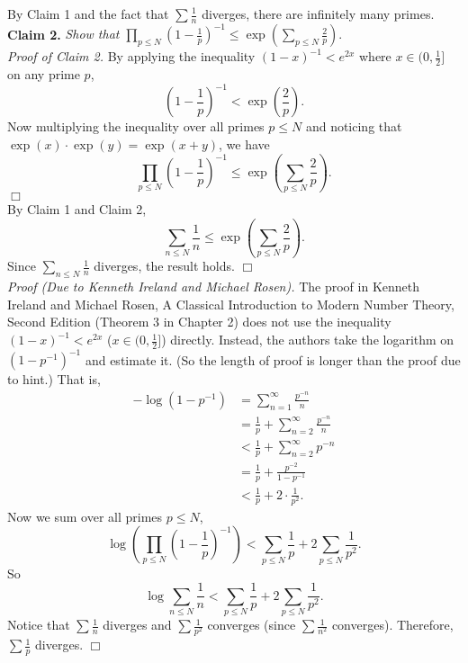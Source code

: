 \documentclass{article}
\begin{document}
By Claim 1 and the fact that $\sum \frac{1}{n}$ diverges,
there are infinitely many primes. \\

\textbf{Claim 2.}
\emph{Show that
$\prod_{p \leq N} \left( 1 - \frac{1}{p} \right)^{-1}
\leq \exp \left( \sum_{p \leq N} \frac{2}{p} \right).$} \\
\emph{Proof of Claim 2.}
By applying the inequality $(1 - x)^{-1} < e^{2x}$ where $x \in (0, \frac{1}{2}]$
on any prime $p$,
$$\left( 1 - \frac{1}{p} \right)^{-1} < \exp \left( \frac{2}{p} \right).$$
Now multiplying the inequality over all primes $p \leq N$ and noticing that
$\exp(x) \cdot \exp(y) = \exp(x + y)$, we have
$$\prod_{p \leq N} \left( 1 - \frac{1}{p} \right)^{-1}
\leq \exp \left( \sum_{p \leq N} \frac{2}{p} \right).$$
$\Box$ \\

By Claim 1 and Claim 2,
$$\sum_{n \leq N} \frac{1}{n}
\leq \exp \left( \sum_{p \leq N} \frac{2}{p} \right).$$
Since $\sum_{n \leq N} \frac{1}{n}$ diverges, the result holds.
$\Box$ \\



\emph{Proof (Due to Kenneth Ireland and Michael Rosen).}
The proof in Kenneth Ireland and Michael Rosen,
A Classical Introduction to Modern Number Theory, Second Edition (Theorem 3 in Chapter 2)
does not use the inequality $(1 - x)^{-1} < e^{2x}$ ($x \in (0, \frac{1}{2}]$) directly.
Instead, the authors take the logarithm on $(1 - p^{-1})^{-1}$ and estimate it.
(So the length of proof is longer than the proof due to hint.)
That is,
\begin{align*}
- \log(1 - p^{-1})
&= \sum_{n = 1}^{\infty} \frac{p^{-n}}{n} \\
&= \frac{1}{p} + \sum_{n = 2}^{\infty} \frac{p^{-n}}{n} \\
&< \frac{1}{p} + \sum_{n = 2}^{\infty} p^{-n} \\
&= \frac{1}{p} + \frac{p^{-2}}{1 - p^{-1}} \\
&< \frac{1}{p} + 2 \cdot \frac{1}{p^2}.
\end{align*}
Now we sum over all primes $p \leq N$,
$$\log \left( \prod_{p \leq N} \left( 1 - \frac{1}{p} \right)^{-1} \right)
< \sum_{p \leq N} \frac{1}{p} + 2 \sum_{p \leq N} \frac{1}{p^2}.$$
So
$$\log \sum_{n \leq N} \frac{1}{n}
< \sum_{p \leq N} \frac{1}{p} + 2 \sum_{p \leq N} \frac{1}{p^2}.$$
Notice that $\sum \frac{1}{n}$ diverges and $\sum \frac{1}{p^2}$ converges
(since $\sum \frac{1}{n^2}$ converges).
Therefore, $\sum \frac{1}{p}$ diverges.
$\Box$ \\
\end{document}
